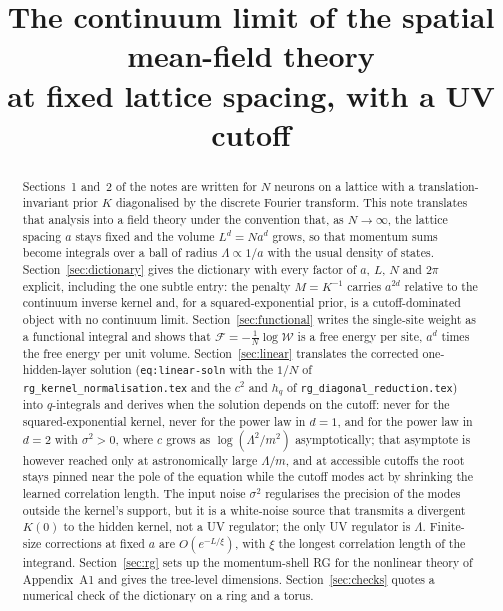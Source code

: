 \documentclass[11pt,a4paper]{article}
\title{The continuum limit of the spatial mean-field theory\\at fixed lattice spacing, with a UV cutoff}
\author{}
\date{}
\newcommand{\W}{\mathcal W}
\newcommand{\F}{\mathcal F}
\newcommand{\Lam}{\Lambda}
\begin{document}
\maketitle

\begin{abstract}
Sections~1 and~2 of the notes are written for $N$ neurons on a lattice with a translation-invariant prior $K$ diagonalised by the discrete Fourier transform. This note translates that analysis into a field theory under the convention that, as $N\to\infty$, the lattice spacing $a$ stays fixed and the volume $L^d = N a^d$ grows, so that momentum sums become integrals over a ball of radius $\Lam\propto 1/a$ with the usual density of states. Section~\ref{sec:dictionary} gives the dictionary with every factor of $a$, $L$, $N$ and $2\pi$ explicit, including the one subtle entry: the penalty $M = K^{-1}$ carries $a^{2d}$ relative to the continuum inverse kernel and, for a squared-exponential prior, is a cutoff-dominated object with no continuum limit. Section~\ref{sec:functional} writes the single-site weight as a functional integral and shows that $\F = -\frac1N\log\W$ is a free energy per site, $a^d$ times the free energy per unit volume. Section~\ref{sec:linear} translates the corrected one-hidden-layer solution (\texttt{eq:linear-soln} with the $1/N$ of \texttt{rg\_kernel\_normalisation.tex} and the $c^2$ and $h_q$ of \texttt{rg\_diagonal\_reduction.tex}) into $q$-integrals and derives when the solution depends on the cutoff: never for the squared-exponential kernel, never for the power law in $d=1$, and for the power law in $d=2$ with $\sigma^2>0$, where $c$ grows as $\log(\Lam^2/m^2)$ asymptotically; that asymptote is however reached only at astronomically large $\Lam/m$, and at accessible cutoffs the root stays pinned near the pole of the equation while the cutoff modes act by shrinking the learned correlation length. The input noise $\sigma^2$ regularises the precision of the modes outside the kernel's support, but it is a white-noise source that transmits a divergent $K(0)$ to the hidden kernel, not a UV regulator; the only UV regulator is $\Lam$. Finite-size corrections at fixed $a$ are $O(e^{-L/\xi})$, with $\xi$ the longest correlation length of the integrand. Section~\ref{sec:rg} sets up the momentum-shell RG for the nonlinear theory of Appendix~A1 and gives the tree-level dimensions. Section~\ref{sec:checks} quotes a numerical check of the dictionary on a ring and a torus.
\end{abstract}
\end{document}
